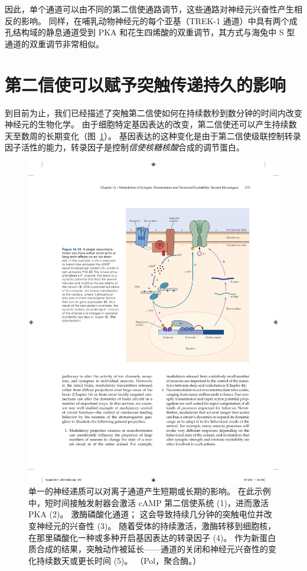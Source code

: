 因此，单个通道可以由不同的第二信使通路调节，这些通路对神经元兴奋性产生相反的影响。
同样，在哺乳动物神经元的每个亚基（TREK-1 通道）中具有两个成孔结构域的静息通道受到 PKA 和花生四烯酸的双重调节，其方式与海兔中 S 型通道的双重调节非常相似。



\section{第二信使可以赋予突触传递持久的影响}

到目前为止，我们已经描述了突触第二信使如何在持续数秒到数分钟的时间内改变神经元的生物化学。
由于细胞特定基因表达的改变，第二信使还可以产生持续数天至数周的长期变化（图~\ref{fig:14_12}）。 
基因表达的这种变化是由于第二信使级联控制转录因子活性的能力，转录因子是控制\textit{信使核糖核酸}合成的调节蛋白。


\begin{figure}[htbp]
	\centering
	\includegraphics[width=0.7\linewidth]{chap14/fig_14_12}
	\caption{单一的神经递质可以对离子通道产生短期或长期的影响。
		在此示例中，短时间接触发射器会激活 cAMP 第二信使系统 (1)，进而激活 PKA (2)。
		激酶磷酸化通道；
		这会导致持续几分钟的突触电位并改变神经元的兴奋性 (3)。
		随着受体的持续激活，激酶转移到细胞核，在那里磷酸化一种或多种开启基因表达的转录因子 (4)。
		作为新蛋白质合成的结果，突触动作被延长——通道的关闭和神经元兴奋性的变化持续数天或更长时间 (5)。
		（Pol，聚合酶。）}
	\label{fig:14_12}
\end{figure}



